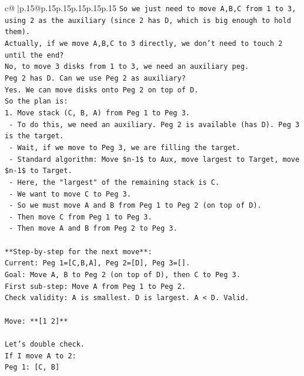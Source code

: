 \documentclass{article}
\begin{document}
{\begin{supertabular}{c@{$\;$}|p{.15\linewidth}@{}p{.15\linewidth}p{.15\linewidth}p{.15\linewidth}p{.15\linewidth}p{.15\linewidth}}
{{{\texttt{So we just need to move A,B,C from 1 to 3, using 2 as the auxiliary (since 2 has D, which is big enough to hold them).} \\
\texttt{Actually, if we move A,B,C to 3 directly, we don't need to touch 2 until the end?} \\
\texttt{No, to move 3 disks from 1 to 3, we need an auxiliary peg.} \\
\texttt{Peg 2 has D. Can we use Peg 2 as auxiliary?} \\
\texttt{Yes. We can move disks onto Peg 2 on top of D.} \\
\texttt{So the plan is:} \\
\texttt{1. Move stack (C, B, A) from Peg 1 to Peg 3.} \\
\texttt{   {-} To do this, we need an auxiliary. Peg 2 is available (has D). Peg 3 is the target.} \\
\texttt{   {-} Wait, if we move to Peg 3, we are filling the target.} \\
\texttt{   {-} Standard algorithm: Move \$n{-}1\$ to Aux, move largest to Target, move \$n{-}1\$ to Target.} \\
\texttt{   {-} Here, the "largest" of the remaining stack is C.} \\
\texttt{   {-} We want to move C to Peg 3.} \\
\texttt{   {-} So we must move A and B from Peg 1 to Peg 2 (on top of D).} \\
\texttt{   {-} Then move C from Peg 1 to Peg 3.} \\
\texttt{   {-} Then move A and B from Peg 2 to Peg 3.} \\
\\ 
\texttt{**Step{-}by{-}step for the next move**:} \\
\texttt{Current: Peg 1={[}C,B,A{]}, Peg 2={[}D{]}, Peg 3={[}{]}.} \\
\texttt{Goal: Move A, B to Peg 2 (on top of D), then C to Peg 3.} \\
\texttt{First sub{-}step: Move A from Peg 1 to Peg 2.} \\
\texttt{Check validity: A is smallest. D is largest. A < D. Valid.} \\
\\ 
\texttt{Move: **{[}1 2{]}**} \\
\\ 
\texttt{Let's double check.} \\
\texttt{If I move A to 2:} \\
\texttt{Peg 1: {[}C, B{]}} \\
}}}
\end{supertabular}}
\end{document}
